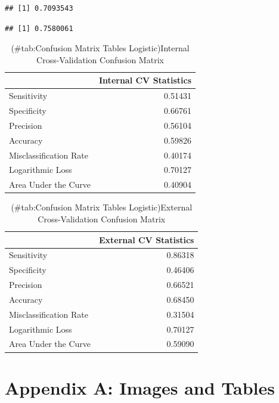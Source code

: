 \documentclass[american,]{article}
\begin{document}
\begin{verbatim}
## [1] 0.7093543
\end{verbatim}

\begin{verbatim}
## [1] 0.7580061
\end{verbatim}

\begin{table}[t]

\caption{(\#tab:Confusion Matrix Tables Logistic)Internal Cross-Validation Confusion Matrix}
\centering
\begin{tabular}{lr}
\toprule
  & Internal CV Statistics\\
\midrule
Sensitivity & 0.51431\\
Specificity & 0.66761\\
Precision & 0.56104\\
Accuracy & 0.59826\\
Misclassification Rate & 0.40174\\
\addlinespace
Logarithmic Loss & 0.70127\\
Area Under the Curve & 0.40904\\
\bottomrule
\end{tabular}
\end{table}

\begin{table}[t]

\caption{(\#tab:Confusion Matrix Tables Logistic)External Cross-Validation Confusion Matrix}
\centering
\begin{tabular}{lr}
\toprule
  & External CV Statistics\\
\midrule
Sensitivity & 0.86318\\
Specificity & 0.46406\\
Precision & 0.66521\\
Accuracy & 0.68450\\
Misclassification Rate & 0.31504\\
\addlinespace
Logarithmic Loss & 0.70127\\
Area Under the Curve & 0.59090\\
\bottomrule
\end{tabular}
\end{table}

\newpage

\hypertarget{appendix-a-images-and-tables}{%
\section{Appendix A: Images and Tables}\label{appendix-a-images-and-tables}}
\end{document}

